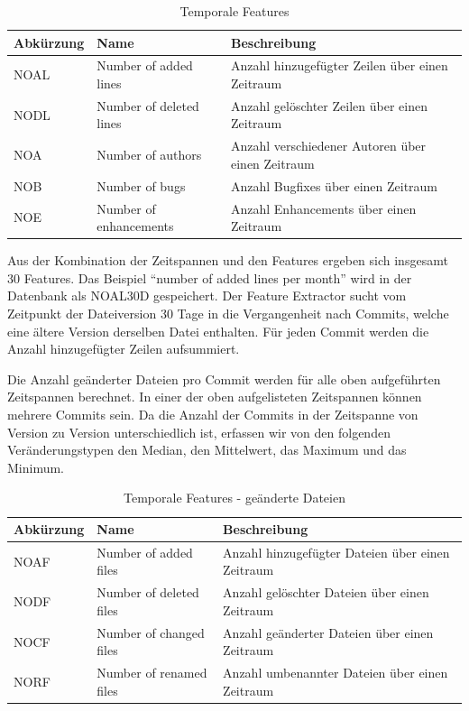 \documentclass[10pt, a4paper]{article}
\begin{document}
\begin{table}[H]
	\begin{tabular}{l|p{3cm}|p{5.75cm}}
		\textbf{Abkürzung} & \textbf{Name} & \textbf{Beschreibung}\\
		\hline
		NOAL & Number of added lines & Anzahl hinzugefügter Zeilen über einen Zeitraum\\
		NODL & Number of deleted lines & Anzahl gelöschter Zeilen über einen Zeitraum\\
		NOA & Number of authors & Anzahl verschiedener Autoren über einen Zeitraum\\
		NOB & Number of bugs & Anzahl Bugfixes über einen Zeitraum\\
		NOE & Number of enhancements & Anzahl Enhancements über einen Zeitraum\\
	\end{tabular}
	\caption{Temporale Features}
	\label{tab:temporalfeatures1}
\end{table}

Aus der Kombination der Zeitspannen und den Features ergeben sich insgesamt 30 Features. Das Beispiel ``number of added lines per month'' wird in der Datenbank als NOAL30D gespeichert. Der Feature Extractor sucht vom Zeitpunkt der Dateiversion 30 Tage in die Vergangenheit nach Commits, welche eine ältere Version derselben Datei enthalten. Für jeden Commit werden die Anzahl hinzugefügter Zeilen aufsummiert.

Die Anzahl geänderter Dateien pro Commit werden für alle oben auf\-ge\-führ\-ten Zeitspannen berechnet. In einer der oben aufgelisteten Zeitspannen können mehrere Commits sein. Da die Anzahl der Commits in der Zeitspanne von Version zu Version unterschiedlich ist, erfassen wir von den folgenden Veränderungstypen den Median, den Mittelwert, das Maximum und das Minimum.
\begin{table}[H]
	\begin{tabular}{l|p{3cm}|p{5.75cm}}
		\textbf{Abkürzung} & \textbf{Name} & \textbf{Beschreibung}\\
		\hline
		NOAF & Number of added files & Anzahl hinzugefügter Dateien über einen Zeitraum\\
		NODF & Number of deleted files & Anzahl gelöschter Dateien über einen Zeitraum\\
		NOCF & Number of changed files & Anzahl geänderter Dateien über einen Zeitraum\\
		NORF & Number of renamed files & Anzahl umbenannter Dateien über einen Zeitraum\\
	\end{tabular}
	\caption{Temporale Features - geänderte Dateien}
	\label{tab:temporalfeatures2}
\end{table}
\end{document}
